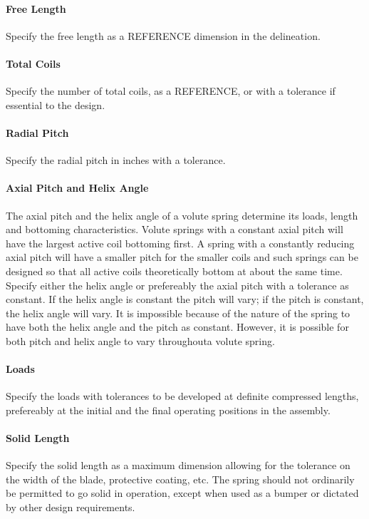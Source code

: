 \documentclass[10pt]{article}
\begin{document}
\paragraph{Free Length} %
Specify the free length as a REFERENCE dimension in the delineation.

\paragraph{Total Coils} %
Specify the number of total coils, as a REFERENCE, or with a tolerance if essential to the design.

\paragraph{Radial Pitch} %
Specify the radial pitch in inches with a tolerance.

\paragraph{Axial Pitch and Helix Angle} %
The axial pitch and the helix angle of a volute spring determine its loads, length and bottoming characteristics. 
Volute springs with a constant axial pitch will have the largest active coil bottoming first. 
A spring with a constantly reducing axial pitch will have a smaller pitch for the smaller coils and such springs can be designed so that all active coils theoretically bottom at about the same time.
Specify either the helix angle or prefereably the axial pitch with a tolerance as constant.
If the helix angle is constant the pitch will vary; if the pitch is constant, the helix angle will vary.
It is impossible because of the nature of the spring to have both the helix angle and the pitch as constant.
However, it is possible for both pitch and helix angle to vary throughouta volute spring.

\paragraph{Loads} %
Specify the loads with tolerances to be developed at definite compressed lengths, prefereably at the initial and the final operating positions in the assembly.

\paragraph{Solid Length}
Specify the solid length as a maximum dimension allowing for the tolerance on the width of the blade, protective coating, etc. 
The spring should not ordinarily be permitted to go solid in operation, except when used as a bumper or dictated by
other design requirements.
\end{document}
